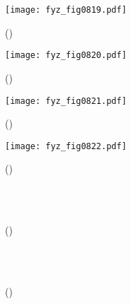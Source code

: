     \begin{figure}[ht!] %
      \centering
      \texttt{[image: fyz\_fig0819.pdf]}
      \caption{
               (\cite[s.~707]{Feynman02})}
      \label{fyz:fig0819}
    \end{figure}

    \begin{figure}[ht!] %
      \centering
      \texttt{[image: fyz\_fig0820.pdf]}
      \caption{
               (\cite[s.~707]{Feynman02})}
      \label{fyz:fig0820}
    \end{figure}

    \begin{figure}[ht!] %
      \centering
      \texttt{[image: fyz\_fig0821.pdf]}
      \caption{
               (\cite[s.~707]{Feynman02})}
      \label{fyz:fig0821}
    \end{figure}

    \begin{figure}[ht!] %
      \centering
      \texttt{[image: fyz\_fig0822.pdf]}
      \caption{
               (\cite[s.~707]{Feynman02})}
      \label{fyz:fig0822}
    \end{figure}

    \begin{figure}[ht!]
      \centering
                     \\
                     \\
      \caption{
               (\cite[s.~748]{Feynman02})}
      \label{fyz:fig0823}
    \end{figure}

    \begin{figure}[ht!]
      \centering
                     \\
                     \\
      \caption{
               (\cite[s.~748]{Feynman02})}
      \label{fyz:fig0824}
    \end{figure}


